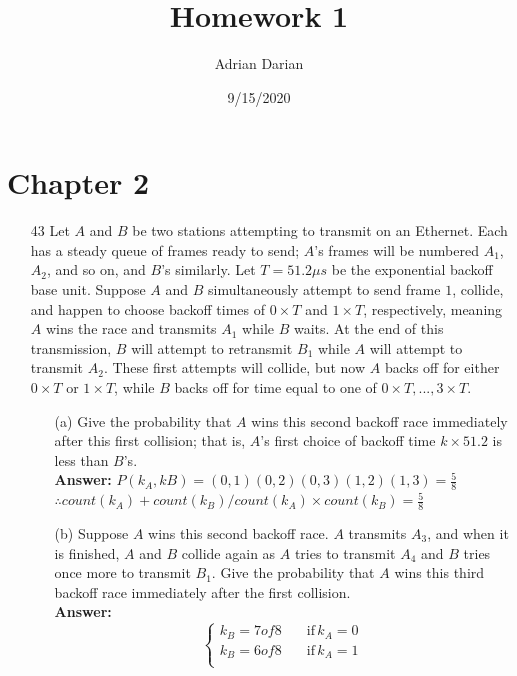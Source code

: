 \documentclass[a4paper]{article}
\title{Homework 1}
\author{Adrian Darian}
\date{9/15/2020}
\begin{document}
  
\maketitle
  
\section*{Chapter 2}
\begin{itemize}
	\item[43] Let $A$ and $B$ be two stations attempting to transmit on an Ethernet. Each has a steady queue of frames ready to send; $A$’s frames will be numbered $A_{1}$, $A_{2}$, and so on, and $B$’s similarly. Let $T = 51.2μs$ be the exponential backoff base unit. Suppose $A$ and $B$ simultaneously attempt to send frame $1$, collide, and happen to choose backoff times of $0 \times T$ and $1 \times T$, respectively, meaning $A$ wins the race and transmits $A_{1}$ while $B$ waits. At the end of this transmission, $B$ will attempt to retransmit $B_{1}$ while $A$ will attempt to transmit $A_{2}$. These first attempts will collide, but now $A$ backs off for either $0 \times T$ or $1 \times T$, while $B$ backs off for time equal to one of $0 \times T, . . . ,3 \times T$.
	      \begin{itemize}
	      	\item[(a)] Give the probability that $A$ wins this second backoff race immediately after this first collision; that is, $A$’s first choice of backoff time $k \times 51.2$ is less than $B$’s. \\
	      	      \textbf{Answer:}  $P(k_{A}, k{B}) = (0, 1)(0, 2)(0, 3)(1, 2)(1, 3) = \frac{5}{8}$ \\
	      	      $\therefore count(k_{A}) + count(k_{B}) / count(k_{A}) \times count(k_{B}) = \frac{5}{8}$
	      	\item[(b)] Suppose $A$ wins this second backoff race. $A$ transmits $A_{3}$, and when it is finished, $A$ and $B$ collide again as $A$ tries to transmit $A_{4}$ and $B$ tries once more to transmit $B_{1}$. Give the probability that $A$ wins this third backoff race immediately after the first collision. \\
	      	      \textbf{Answer:} \begin{equation*}
	      	      \begin{cases}
	      	      	k_{B} = 7 of 8 \quad & \text{if} \, k_{A} = 0 \\
	      	      	k_{B} = 6 of 8 \quad & \text{if} \, k_{A} = 1 \\

\end{cases}
\end{equation*}
\end{itemize}
\end{itemize}
\end{document}
